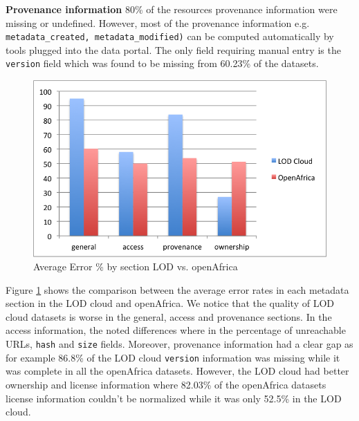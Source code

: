 \documentclass{sig-alternate}
\begin{document}
\textbf{Provenance information} 80\% of the resources provenance information were missing or undefined. However, most of the provenance information e.g. \texttt{metadata\_created, metadata\_modified)} can be computed automatically by tools plugged into the data portal. The only field requiring manual entry is the \texttt{version} field which was found to be missing from 60.23\% of the datasets.

\begin{figure}[!hpt]
\centering
\includegraphics[width=.8\linewidth]{metadata_LOD_vs_Africa.png}
\caption{Average Error \% by section LOD vs. openAfrica}
\label{fig:2}
\end{figure}

Figure \ref{fig:2} shows the comparison between the average error rates in each metadata section in the LOD cloud and openAfrica. We notice that the quality of LOD cloud datasets is worse in the general, access and provenance sections. In the access information, the noted differences where in the percentage of unreachable URLs, \texttt{hash} and \texttt{size} fields. Moreover, provenance information had a clear gap as for example 86.8\% of the LOD cloud \texttt{version} information was missing while it was complete in all the openAfrica datasets. However, the LOD cloud had better ownership and license information where 82.03\% of the openAfrica datasets license information couldn't be normalized while it was only 52.5\% in the LOD cloud.


\end{document}
